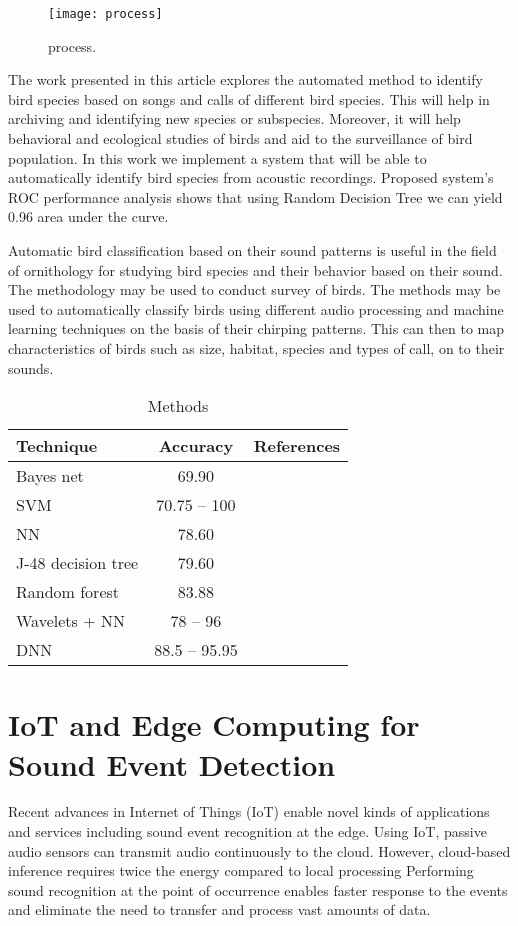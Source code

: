 \begin{figure}[H]
\centering
\texttt{[image: process]}
\caption{process.}
\end{figure}

 The work presented in this article explores the automated method to identify bird species based on songs and calls of different bird species. This will help in archiving and identifying new species or subspecies. Moreover, it will help behavioral and ecological studies of birds and aid to the surveillance of bird population. In this work we implement a system that will be able to automatically identify bird species from acoustic recordings. Proposed system's ROC performance analysis shows that using Random Decision Tree we can yield 0.96 area under the curve.


Automatic bird classification based on their sound patterns is useful in the field of ornithology for studying bird species and their behavior based on their sound. The methodology may be used to conduct survey of birds. The methods may be used to automatically classify birds using different audio processing and machine learning techniques on the basis of their chirping patterns. This can then to map characteristics of birds such as size, habitat, species and types of call, on to their sounds.\cite{Raghuram2016}

\begin{table}
\renewcommand{\arraystretch}{.75}
\caption{Methods}
\centering
\small
\begin{tabular}{|l|c|c|}
\hline
\textbf{Technique}	&  \textbf{Accuracy} & \textbf{References} \\
\hline
Bayes net			& 69.90 			& \cite{Raghuram2016} \\
SVM 					& 70.75 -- 100 	& \cite{Raghuram2016}\cite{Zhao2017}\cite{Knapp2016} \\
NN 					& 78.60 			& \cite{Raghuram2016} \\
J-48 decision tree 	& 79.60 			& \cite{Raghuram2016} \\
Random forest 		& 83.88 			& \cite{Raghuram2016} \\
Wavelets + NN 		& 78 -- 96 		& \cite{Selin2007} \\
DNN 					& 88.5 -- 95.95	& \cite{Xie2019}\cite{Cakir2017} \\
\hline
\end{tabular}
\end{table}


\section{IoT and Edge Computing for Sound Event Detection}
	Recent advances in Internet of Things (IoT) enable novel kinds of applications and services including sound event recognition at the edge.
	Using IoT, passive audio sensors can transmit audio continuously to the cloud.
	However, cloud-based inference requires twice the energy compared to local processing \citep{Lane2016}
	Performing sound recognition at the point of occurrence enables faster response to the events and eliminate the need to transfer and process vast amounts of data.

